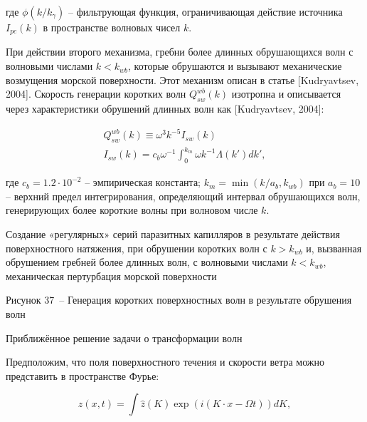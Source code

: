 где $\phi (k/k_{\gamma } )$ -- фильтрующая функция, ограничивающая действие источника $I_{pc} (k)$ в пространстве волновых чисел $k$.

При действии второго механизма, гребни более длинных обрушающихся волн с волновыми числами $k<k_{wb} $, которые обрушаются и вызывают механические возмущения морской поверхности. Этот механизм описан в статье [Kudryavtsev, 2004]. Скорость генерации коротких волн $Q_{sw}^{wb} (k)$ изотропна и описывается через характеристики обрушений длинных волн как [Kudryavtsev, 2004]:



\begin{equation} \label{1.35)} \begin{array}{l} {Q_{sw}^{wb} (k)\equiv \omega ^{3} k^{-5} I_{sw} (k)} \\ {I_{sw} (k)=c_{b} \omega ^{-1} \int _{0}^{k_{m} }\omega k^{-1} \Lambda (k')dk' ,} \end{array} \end{equation} 



где $c_{b} =1.2\cdot 10^{-2} $ -- эмпирическая константа; $k_{m} =\min (k/a_{b} ,k_{wb} )$ при $a_{b} =10$ -- верхний предел интегрирования, определяющий интервал обрушающихся волн, генерирующих более короткие волны при волновом числе $k$. 







Создание «регулярных» серий паразитных капилляров в результате действия поверхностного натяжения, при обрушении коротких волн с $k>k_{wb} $ и, вызванная обрушением гребней более длинных волн, с волновыми числами $k<k_{wb} $, механическая пертурбация морской поверхности



Рисунок 37~-- Генерация коротких поверхностных волн в результате обрушения волн



 Приближённое решение задачи о трансформации волн

Предположим, что поля поверхностного течения и скорости ветра можно представить в пространстве Фурье:



\begin{equation} \label{1.36)} z\left(x,t\right)=\int \widehat{z}\left(K\right) \exp \left(i\left(K\cdot x-\Omega t\right)\right)dK,  \end{equation} 



